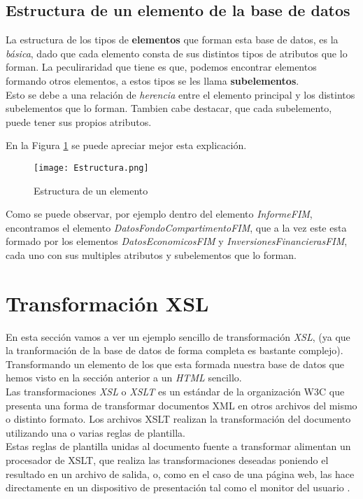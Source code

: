 \documentclass[11pt]{diazessay} %
\begin{document}
\subsection*{Estructura de un elemento de la base de datos}
La estructura de los tipos de \textbf{elementos} que forman esta base de datos, es la \textit{básica}, dado que cada elemento consta de sus distintos tipos de atributos que lo forman. La peculiraridad que tiene es que, podemos encontrar elementos formando otros elementos, a estos tipos se les llama \textbf{subelementos}.\\
Esto se debe a una relación de \textit{herencia} entre el elemento principal y los distintos subelementos que lo forman. Tambien cabe destacar, que cada subelemento, puede tener sus propios atributos.

En la Figura \ref{fig:estructura} se puede apreciar mejor esta explicación.

\begin{figure}[h!]
	\centering
	\texttt{[image: Estructura.png]}
	\caption{Estructura de un elemento}
	\label{fig:estructura}
\end{figure}


Como se puede observar, por ejemplo dentro del elemento \textit{InformeFIM}, encontramos el elemento \textit{DatosFondoCompartimentoFIM}, que a la vez este esta formado por los elementos \textit{DatosEconomicosFIM} y \textit{InversionesFinancierasFIM}, cada uno con sus multiples atributos y subelementos que lo forman.


\newpage
\section*{Transformación XSL}
En esta sección vamos a ver un ejemplo sencillo de transformación \textit{XSL}, (ya que la tranformación de la base de datos de forma completa es bastante complejo).\\ Transformando un elemento de los que esta formada nuestra base de datos que hemos visto en la sección anterior a un \textit{HTML} sencillo. \\

Las transformaciones \textit{XSL} o \textit{XSLT} es un estándar de la organización W3C que presenta una forma de transformar documentos XML en otros archivos del mismo o distinto formato. Los archivos XSLT realizan la transformación del documento utilizando una o varias reglas de plantilla.\\

Estas reglas de plantilla unidas al documento fuente a transformar alimentan un procesador de XSLT, que realiza las transformaciones deseadas poniendo el resultado en un archivo de salida, o, como en el caso de una página web, las hace directamente en un dispositivo de presentación tal como el monitor del usuario \cite{xslt}.\\
\end{document}
